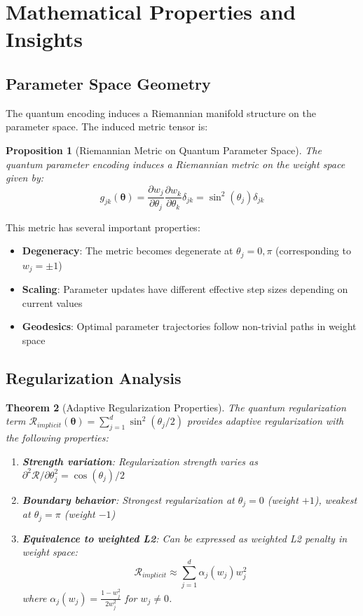 \documentclass[11pt]{article}
\newtheorem{theorem}{Theorem}[section]
\newtheorem{proposition}[theorem]{Proposition}
\begin{document}
\section{Mathematical Properties and Insights}

\subsection{Parameter Space Geometry}

The quantum encoding induces a Riemannian manifold structure on the parameter space. The induced metric tensor is:

\begin{proposition}[Riemannian Metric on Quantum Parameter Space]
The quantum parameter encoding induces a Riemannian metric on the weight space given by:
\begin{equation}
g_{jk}(\bm{\theta}) = \frac{\partial w_j}{\partial \theta_j} \frac{\partial w_k}{\partial \theta_k} \delta_{jk} = \sin^2(\theta_j) \delta_{jk}
\label{eq:parameter_metric}
\end{equation}
\end{proposition}

This metric has several important properties:
\begin{itemize}
\item \textbf{Degeneracy}: The metric becomes degenerate at $\theta_j = 0, \pi$ (corresponding to $w_j = \pm 1$)
\item \textbf{Scaling}: Parameter updates have different effective step sizes depending on current values
\item \textbf{Geodesics}: Optimal parameter trajectories follow non-trivial paths in weight space
\end{itemize}

\subsection{Regularization Analysis}

\begin{theorem}[Adaptive Regularization Properties]
The quantum regularization term $\mathcal{R}_{implicit}(\bm{\theta}) = \sum_{j=1}^d \sin^2(\theta_j/2)$ provides adaptive regularization with the following properties:

\begin{enumerate}
\item \textbf{Strength variation}: Regularization strength varies as $\partial^2 \mathcal{R}/\partial \theta_j^2 = \cos(\theta_j)/2$
\item \textbf{Boundary behavior}: Strongest regularization at $\theta_j = 0$ (weight $+1$), weakest at $\theta_j = \pi$ (weight $-1$)
\item \textbf{Equivalence to weighted L2}: Can be expressed as weighted L2 penalty in weight space:
\begin{equation}
\mathcal{R}_{implicit} \approx \sum_{j=1}^d \alpha_j(w_j) w_j^2
\end{equation}
where $\alpha_j(w_j) = \frac{1-w_j^2}{2w_j^2}$ for $w_j \neq 0$.
\end{enumerate}
\end{theorem}
\end{document}

